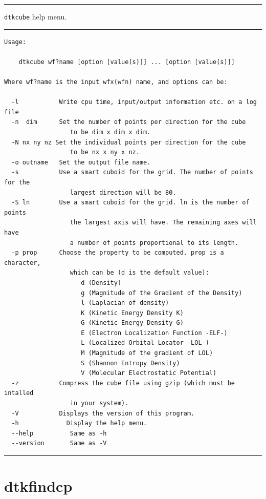 \rule{\textwidth}{1pt}
{\center\texttt{dtkcube} help menu.\\}
\rule{\textwidth}{1pt}
\begin{footnotesize}
\begin{verbatim}
Usage:

	dtkcube wf?name [option [value(s)]] ... [option [value(s)]]

Where wf?name is the input wfx(wfn) name, and options can be:

  -l           Write cpu time, input/output information etc. on a log file
  -n  dim      Set the number of points per direction for the cube
                  to be dim x dim x dim.
  -N nx ny nz Set the individual points per direction for the cube
                  to be nx x ny x nz.
  -o outname   Set the output file name.
  -s           Use a smart cuboid for the grid. The number of points for the
                  largest direction will be 80.
  -S ln        Use a smart cuboid for the grid. ln is the number of points
                  the largest axis will have. The remaining axes will have
                  a number of points proportional to its length.
  -p prop      Choose the property to be computed. prop is a character,
                  which can be (d is the default value): 
                     d (Density)
                     g (Magnitude of the Gradient of the Density)
                     l (Laplacian of density)
                     K (Kinetic Energy Density K)
                     G (Kinetic Energy Density G)
                     E (Electron Localization Function -ELF-)
                     L (Localized Orbital Locator -LOL-)
                     M (Magnitude of the gradient of LOL)
                     S (Shannon Entropy Density)
                     V (Molecular Electrostatic Potential)
  -z           Compress the cube file using gzip (which must be intalled
                  in your system).
  -V           Displays the version of this program.
  -h	         Display the help menu.
  --help          Same as -h
  --version       Same as -V
\end{verbatim}
\end{footnotesize}
\rule{\textwidth}{1pt}
\section{dtkfindcp}\label{sec:dtkfindcp}

